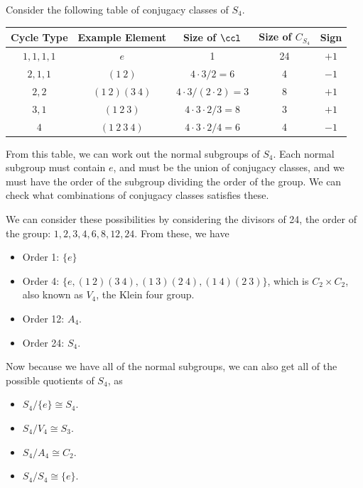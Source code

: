 \documentclass[a4paper]{scrartcl}
\begin{document}
\begin{example}
	Consider the following table of conjugacy classes of $S_4$.
	\begin{center}
			\begin{tabular}{@{}ccccc@{}}
			\toprule
			Cycle Type & Example Element & Size of $\ccl$ & Size of $C_{S_4}$ & Sign \\ \midrule
			$1, 1, 1, 1$ & $e$   & 1                       &  24           & $+1$    \\
			$2, 1, 1$		& $(1\ 2)$        &     $4 \cdot 3 / 2 = 6$     &        4      &  $-1$    \\ 
			$2, 2$  & $(1\ 2)(3\ 4)$  & $4 \cdot 3 / (2 \cdot 2) = 3$                          &      8        &   $+1$   \\ 
			$3, 1$		   & $(1\ 2\ 3)$               &  $4 \cdot 3 \cdot 2 / 3 = 8$                       &        3      &  $+1$    \\ 
			$4$		   & $(1\ 2\ 3\ 4)$              &    $4 \cdot 3 \cdot 2 / 4 = 6$                     &        4      &  $-1$    \\ 
			\bottomrule
			\end{tabular}
		\end{center}
		From this table, we can work out the normal subgroups of $S_4$. Each normal subgroup must contain $e$, and must be the union of conjugacy classes, and we must have the order of the subgroup dividing the order of the group. We can check what combinations of conjugacy classes satisfies these.

		We can consider these possibilities by considering the divisors of 24, the order of the group: $1, 2, 3, 4, 6, 8, 12, 24$. From these, we have
		\begin{itemize}
			\item Order 1: $\{e\}$
			\item Order 4: $\{e, (1\ 2)(3\ 4), (1\ 3)(2\ 4), (1\ 4)(2\ 3)\}$, which is $C_2 \times C_2$, also known as $V_4$, the Klein four group.
			\item Order 12: $A_4$.
			\item Order 24: $S_4$.
		\end{itemize}

		Now because we have all of the normal subgroups, we can also get all of the possible quotients of $S_4$, as
		\begin{itemize}
			\item $S_4/\{e\} \cong S_4$.
			\item $S_4 / V_4 \cong S_3$.
			\item $S_4/A_4 \cong C_2$.
			\item $S_4 / S_4 \cong \{e\}$.
		\end{itemize}
\end{example}
\end{document}
